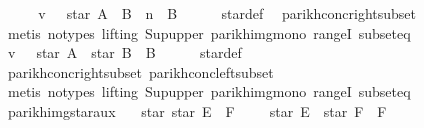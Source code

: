 \begin{isabellebody}
\ \ \isamarkupfalse%
\ \isamarkupfalse%
\ {\isachardoublequoteopen}v\ {\isasymin}\ {\isasymPsi}\ {\isacharparenleft}{\kern0pt}star\ A\ {\isacharat}{\kern0pt}{\isacharat}{\kern0pt}\ B\ {\isacharcircum}{\kern0pt}{\isacharcircum}{\kern0pt}\ n\ {\isacharat}{\kern0pt}{\isacharat}{\kern0pt}\ B{\isacharparenright}{\kern0pt}{\isachardoublequoteclose}\isanewline
\ \ \ \ \isamarkupfalse%
\ star{\isacharunderscore}{\kern0pt}def\ \isamarkupfalse%
\ parikh{\isacharunderscore}{\kern0pt}conc{\isacharunderscore}{\kern0pt}right{\isacharunderscore}{\kern0pt}subset\isanewline
\ \ \ \ \isamarkupfalse%
\ {\isacharparenleft}{\kern0pt}metis\ {\isacharparenleft}{\kern0pt}no{\isacharunderscore}{\kern0pt}types{\isacharcomma}{\kern0pt}\ lifting{\isacharparenright}{\kern0pt}\ Sup{\isacharunderscore}{\kern0pt}upper\ parikh{\isacharunderscore}{\kern0pt}img{\isacharunderscore}{\kern0pt}mono\ rangeI\ subset{\isacharunderscore}{\kern0pt}eq{\isacharparenright}{\kern0pt}\isanewline
\ \ \isamarkupfalse%
\ \isamarkupfalse%
\ {\isachardoublequoteopen}v\ {\isasymin}\ {\isasymPsi}\ {\isacharparenleft}{\kern0pt}star\ A\ {\isacharat}{\kern0pt}{\isacharat}{\kern0pt}\ star\ B\ {\isacharat}{\kern0pt}{\isacharat}{\kern0pt}\ B{\isacharparenright}{\kern0pt}{\isachardoublequoteclose}\isanewline
\ \ \ \ \isamarkupfalse%
\ star{\isacharunderscore}{\kern0pt}def\ \isamarkupfalse%
\ parikh{\isacharunderscore}{\kern0pt}conc{\isacharunderscore}{\kern0pt}right{\isacharunderscore}{\kern0pt}subset\ parikh{\isacharunderscore}{\kern0pt}conc{\isacharunderscore}{\kern0pt}left{\isacharunderscore}{\kern0pt}subset\isanewline
\ \ \ \ \isamarkupfalse%
\ {\isacharparenleft}{\kern0pt}metis\ {\isacharparenleft}{\kern0pt}no{\isacharunderscore}{\kern0pt}types{\isacharcomma}{\kern0pt}\ lifting{\isacharparenright}{\kern0pt}\ Sup{\isacharunderscore}{\kern0pt}upper\ parikh{\isacharunderscore}{\kern0pt}img{\isacharunderscore}{\kern0pt}mono\ rangeI\ subset{\isacharunderscore}{\kern0pt}eq{\isacharparenright}{\kern0pt}\isanewline
{}\isamarkupfalse%
%
\endisatagproof
{\isafoldproof}%
%
\isadelimproof
\isanewline
%
\endisadelimproof
\isanewline
{}\isamarkupfalse%
\ parikh{\isacharunderscore}{\kern0pt}img{\isacharunderscore}{\kern0pt}star{}{\isacharunderscore}{\kern0pt}aux{}{\isacharcolon}{\kern0pt}\isanewline
\ \ {\isachardoublequoteopen}{\isasymPsi}\ {\isacharparenleft}{\kern0pt}star\ {\isacharparenleft}{\kern0pt}star\ E\ {\isacharat}{\kern0pt}{\isacharat}{\kern0pt}\ F{\isacharparenright}{\kern0pt}{\isacharparenright}{\kern0pt}\ {\isasymsubseteq}\ {\isasymPsi}\ {\isacharparenleft}{\kern0pt}{\isacharbraceleft}{\kern0pt}{\isacharbrackleft}{\kern0pt}{\isacharbrackright}{\kern0pt}{\isacharbraceright}{\kern0pt}\ {\isasymunion}\ star\ E\ {\isacharat}{\kern0pt}{\isacharat}{\kern0pt}\ star\ F\ {\isacharat}{\kern0pt}{\isacharat}{\kern0pt}\ F{\isacharparenright}{\kern0pt}{\isachardoublequoteclose}\isanewline

\end{isabellebody}
